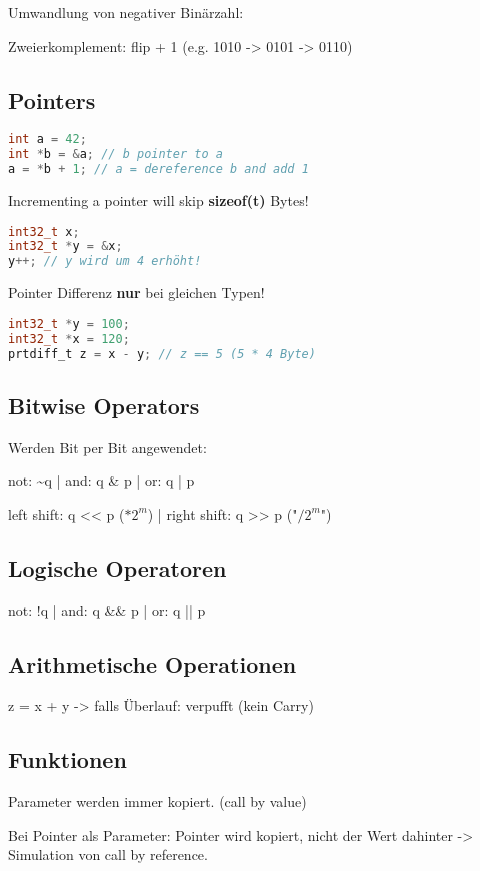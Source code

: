 \begin{multicols*}{4}
Umwandlung von negativer Binärzahl:

Zweierkomplement: flip + 1 (e.g. 1010 -> 0101 -> 0110)

\subsection{Pointers}

\begin{lstlisting}[language=c]
int a = 42;
int *b = &a; // b pointer to a
a = *b + 1; // a = dereference b and add 1
\end{lstlisting}
Incrementing a pointer will skip \textbf{sizeof(t)} Bytes!
\begin{lstlisting}[language=c]
int32_t x;
int32_t *y = &x;
y++; // y wird um 4 erhöht!
\end{lstlisting}
\vspace{2pt}
Pointer Differenz \textbf{nur} bei gleichen Typen!
\begin{lstlisting}[language=c]
int32_t *y = 100;
int32_t *x = 120;
prtdiff_t z = x - y; // z == 5 (5 * 4 Byte)
\end{lstlisting}

\subsection{Bitwise Operators}
Werden Bit per Bit angewendet:

not: \~{}q | and: q \& p | or: q | p

left shift: q << p (\(* 2^m\)) | right shift: q >> p ("\(/ 2^m\)")

\subsection{Logische Operatoren}
not: !q | and: q \&\& p | or: q || p

\subsection{Arithmetische Operationen}
z = x + y -> falls Überlauf: verpufft (kein Carry)

\subsection{Funktionen}
Parameter werden immer kopiert. (call by value)\vspace{2pt}

Bei Pointer als Parameter: Pointer wird kopiert, nicht der Wert dahinter -> Simulation von call by reference.\vspace{2pt}


\end{multicols*}
